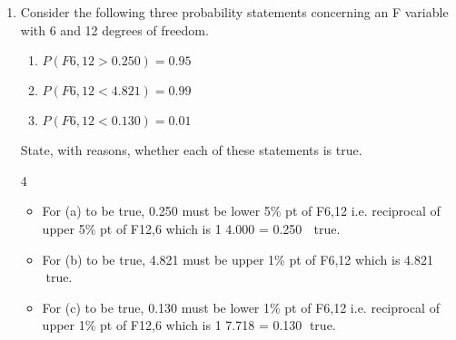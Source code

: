 \documentclass[a4paper,12pt]{article}
\begin{document}
\begin{enumerate}
\newpage
\item Consider the following three probability statements concerning an F variable
with 6 and 12 degrees of freedom.
\begin{enumerate}
\item $P(F6,12 > 0.250) = 0.95$
\item $P(F6,12 < 4.821) = 0.99$
\item $P(F6,12 < 0.130) = 0.01$
\end{enumerate}

State, with reasons, whether each of these statements is true. 


4 
\begin{itemize}
\item For (a) to be true, 0.250 must be lower 5\% pt of F6,12 i.e. reciprocal of upper 5\% pt
of F12,6 which is
1
4.000
= 0.250  true.
    \item For (b) to be true, 4.821 must be upper 1\% pt of F6,12 which is 4.821 true.
\item For (c) to be true, 0.130 must be lower 1\% pt of F6,12 i.e. reciprocal of upper 1\% pt
of F12,6 which is
1
7.718
= 0.130 true.

\end{itemize}

\newpage
 
\end{enumerate}





\end{document}
